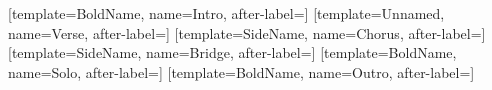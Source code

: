 




[template=BoldName, name=Intro, after-label={}]
[template=Unnamed, name=Verse, after-label={}]
[template=SideName, name=Chorus, after-label={}]
[template=SideName, name=Bridge, after-label={}]
[template=BoldName, name=Solo, after-label={}]
[template=BoldName, name=Outro, after-label={}]




